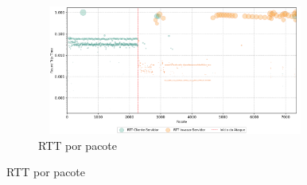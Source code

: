 \begin{apendicesenv}
\begin{figure}[htbp!]
\begin{subfigure}[t]{0.5\textwidth}
        \centering
        \caption{RTT por pacote}
        \includegraphics[width=1\textwidth, height=120pt]{USPSC-img/output/cropped/0-dos_function_call_null_deref-rttp.png}
    \end{subfigure}%
\end{figure}


\end{apendicesenv}
